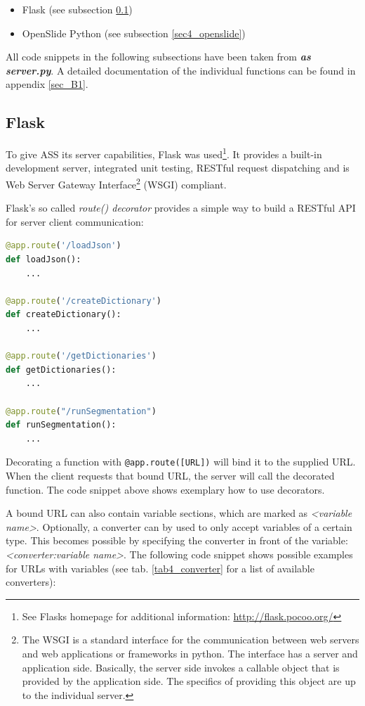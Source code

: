\begin{itemize}
	\item Flask (see subsection \ref{sec4_flask})
	\item OpenSlide Python (see subsection \ref{sec4_openslide})
\end{itemize}

All code snippets in the following subsections have been taken from \emph{\textbf{as{\textunderscore} server.py}}. A detailed documentation of the individual functions can be found in appendix \ref{sec_B1}.


\subsection{Flask}
\label{sec4_flask}
To give ASS its server capabilities, Flask was used\footnote{
	See Flasks homepage for additional information: \url{http://flask.pocoo.org/}
}. It provides a built-in development server, integrated unit testing, RESTful request dispatching and is Web Server Gateway Interface\footnote{
		The WSGI is a standard interface for the communication between web servers and web applications or frameworks in python. The interface has a server and application side. Basically, the server side invokes a callable object that is provided by the application side. The specifics of providing this object are up to the individual server\cite{Brandl16}.
} (WSGI) compliant\cite{web:flask}.

Flask's so called \emph{route() decorator} provides a simple way to build a RESTful API for server client communication:

\begin{lstlisting}[language=Python, frame=single]
@app.route('/loadJson')
def loadJson(): 
	...

@app.route('/createDictionary')
def createDictionary():
	...

@app.route('/getDictionaries')
def getDictionaries():
	...
	
@app.route("/runSegmentation")
def runSegmentation():
	...
\end{lstlisting}

Decorating a function with \texttt{@app.route([URL])} will bind it to the supplied URL. When the client requests that bound URL, the server will call the decorated function\cite{web:flask}. The code snippet above shows exemplary how to use decorators.

A bound URL can also contain variable sections, which are marked as \emph{{\textless}variable name{\textgreater}}. Optionally, a converter can by used to only accept variables of a certain type. This becomes possible by specifying the converter in front of the variable: \emph{{\textless}converter:variable name{\textgreater}}\cite{web:flask}. The following code snippet shows possible examples for URLs with variables (see tab. \ref{tab4_converter} for a list of available converters):

